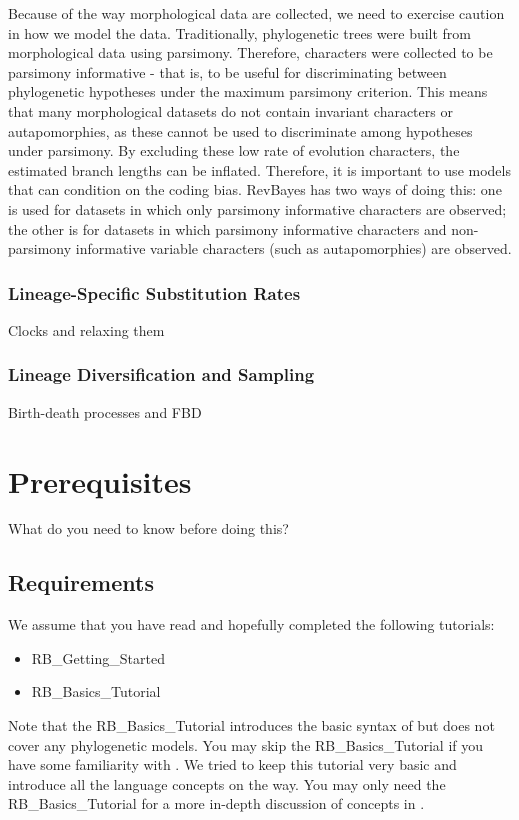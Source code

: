 Because of the way morphological data are collected, we need to exercise caution in how we model the data. 
Traditionally, phylogenetic trees were built from morphological data using parsimony. 
Therefore, characters were collected to be parsimony informative - that is, to be useful for discriminating between phylogenetic hypotheses under the maximum parsimony criterion.
This means that many morphological datasets do not contain invariant characters or autapomorphies, as these cannot be used to discriminate among hypotheses under parsimony. 
By excluding these low rate of evolution characters, the estimated branch lengths can be inflated.
Therefore, it is important to use models that can condition on the coding bias. 
RevBayes has two ways of doing this: one is used for datasets in which only parsimony informative characters are observed; the other is for datasets in which parsimony informative characters and non-parsimony informative variable characters (such as autapomorphies) are observed. \par


\subsubsection{Lineage-Specific Substitution Rates}

Clocks \citep{Zuckerkandl1962} and relaxing them 

\subsubsection{Lineage Diversification and Sampling}

Birth-death processes and FBD

\section{Prerequisites}

What do you need to know before doing this?

\subsection{Requirements}
We assume that you have read and hopefully completed the following tutorials:
\begin{itemize}
\item RB\_Getting\_Started
\item RB\_Basics\_Tutorial
\end{itemize}
Note that the RB\_Basics\_Tutorial introduces the basic syntax of \Rev but does not cover any phylogenetic models.
You may skip the RB\_Basics\_Tutorial if you have some familiarity with \R.
We tried to keep this tutorial very basic and introduce all the language concepts on the way.
You may only need the RB\_Basics\_Tutorial for a more in-depth discussion of concepts in \Rev.




